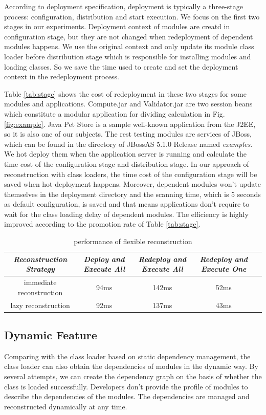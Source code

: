 \documentclass[conference]{IEEEtran}
\begin{document}
According to deployment specification\cite{jsr88}, deployment is typically a three-stage process: configuration, distribution and start execution.
We focus on the first two stages in our experiments.
Deployment context of modules are creatd in configuration stage, but they are not changed when redeployment of dependent modules happens.
We use the original context and only update its module class loader before distribution stage which is responsible for installing modules and loading classes.
So we save the time used to create and set the deployment context in the redeployment process.

Table \ref{tab:stage} shows the cost of redeployment in these two stages for some modules and applications.
Compute.jar and Validator.jar are two session beans which constitute a modular application for dividing calculation in Fig. \ref{fig:example}.
Java Pet Store\cite{java_pet_store} is a sample well-known application from the J2EE\cite{j2ee}, so it is also one of our subjects.
The rest testing modules are services of JBoss, which can be found in the directory of JBossAS 5.1.0 Release named \emph{examples}.
We hot deploy them when the application server is running and calculate the time cost of the configuration stage and distribution stage.
In our approach of reconstruction with class loaders, the time cost of the configuration stage will be saved when hot deployment happens.
Moreover, dependent modules won't update themselves in the deployment directory and the scanning time, which is 5 seconds as default configuration, is saved and that means applications don't require to wait for the class loading delay of dependent modules. 
The efficiency is highly improved according to the promotion rate of Table \ref{tab:stage}.

\begin{table}
\centering
\caption{performance of flexible reconstruction}
\label{tab:flexibility}
\begin{tabular}{|c|c|c|c|c|}
\hline
\emph{Reconstruction Strategy}	& \emph{Deploy and Execute All}	& \emph{Redeploy and Execute All} & \emph{Redeploy and Execute One}\\
\hline
\hline
immediate reconstruction 	&	94ms				&	142ms				&	52ms\\
\hline
lazy reconstruction 	&	92ms				&	137ms				&	43ms\\
\hline
\end{tabular}
\end{table}


\subsection{Dynamic Feature}
Comparing with the class loader based on static dependency management, the class loader can also obtain the dependencies of modules in the dynamic way.
By several attempts, we can create the dependency graph on the basis of whether the class is loaded successfully.
Developers don't provide the profile of modules to describe the dependencies of the modules.
The dependencies are managed and reconstructed dynamically at any time.
\end{document}
